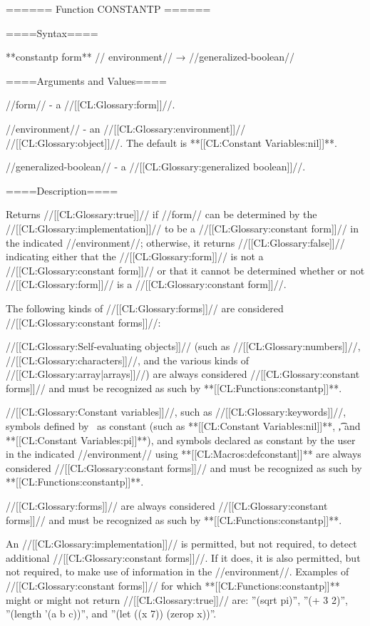 ====== Function CONSTANTP ======

====Syntax====

**constantp {form** //\opt} environment// → //generalized-boolean//

====Arguments and Values====

//form// - a //[[CL:Glossary:form]]//.

//environment// - an //[[CL:Glossary:environment]]// //[[CL:Glossary:object]]//. The default is **[[CL:Constant Variables:nil]]**.

//generalized-boolean// - a //[[CL:Glossary:generalized boolean]]//.

====Description====

Returns //[[CL:Glossary:true]]// if //form// can be determined by the //[[CL:Glossary:implementation]]// to be a //[[CL:Glossary:constant form]]// in the indicated //environment//; otherwise, it returns //[[CL:Glossary:false]]// indicating either that the //[[CL:Glossary:form]]// is not a //[[CL:Glossary:constant form]]// or that it cannot be determined whether or not //[[CL:Glossary:form]]// is a //[[CL:Glossary:constant form]]//.

The following kinds of //[[CL:Glossary:forms]]// are considered //[[CL:Glossary:constant forms]]//: \beginlist \itemitem{\bull}

//[[CL:Glossary:Self-evaluating objects]]// (such as //[[CL:Glossary:numbers]]//, //[[CL:Glossary:characters]]//, and the various kinds of //[[CL:Glossary:array|arrays]]//) are always considered //[[CL:Glossary:constant forms]]// and must be recognized as such by **[[CL:Functions:constantp]]**.

\itemitem{\bull} //[[CL:Glossary:Constant variables]]//, such as //[[CL:Glossary:keywords]]//, symbols defined by \clisp\ as constant (such as **[[CL:Constant Variables:nil]]**, \t, and **[[CL:Constant Variables:pi]]**), and symbols declared as constant by the user in the indicated //environment// using **[[CL:Macros:defconstant]]** are always considered //[[CL:Glossary:constant forms]]// and must be recognized as such by **[[CL:Functions:constantp]]**.

\itemitem{\bull}  //[[CL:Glossary:forms]]// are always considered //[[CL:Glossary:constant forms]]// and must be recognized as such by **[[CL:Functions:constantp]]**.

\itemitem{\bull} An //[[CL:Glossary:implementation]]// is permitted, but not required, to detect additional //[[CL:Glossary:constant forms]]//. If it does, it is also permitted, but not required, to make use of information in the //environment//. Examples of //[[CL:Glossary:constant forms]]// for which **[[CL:Functions:constantp]]** might or might not return //[[CL:Glossary:true]]// are: ''(sqrt pi)'', ''(+ 3 2)'', ''(length '(a b c))'', and ''(let ((x 7)) (zerop x))''. \endlist

